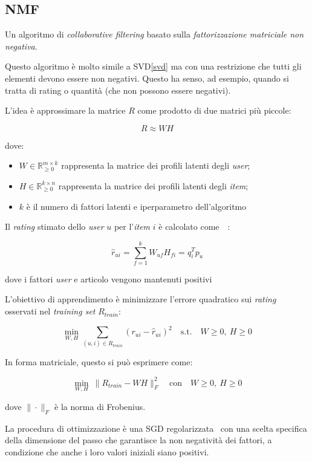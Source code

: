 \subsection{NMF}\label{nmf}

Un algoritmo di \textit{collaborative filtering} basato sulla \textit{fattorizzazione matriciale non negativa}.  

Questo algoritmo è molto simile a SVD\ref{svd} ma con una restrizione che tutti gli elementi devono essere non negativi. Questo ha senso, ad esempio, quando si tratta di rating o quantità (che non possono essere negativi).

L'idea è approssimare la matrice $R$ come prodotto di due matrici più piccole:

\[
R \approx WH
\]

dove:
\begin{itemize}
    \item $W \in \mathbb{R}_{\geq 0}^{m \times k}$ rappresenta la matrice dei profili latenti degli \textit{user};
    \item $H \in \mathbb{R}_{\geq 0}^{k \times n}$ rappresenta la matrice dei profili latenti degli \textit{item};
    \item $k$ è il numero di fattori latenti e iperparametro dell'algoritmo
\end{itemize}

Il \textit{rating} stimato dello \textit{user} $u$ per l'\textit{item} $i$ è calcolato come~\cite{NMF2}~\cite{NMF3}:

\[
\hat{r}_{ui} = \sum_{f=1}^k W_{uf} H_{fi} = q_i^T p_u
\]

dove i fattori \textit{user} e articolo vengono mantenuti positivi

L'obiettivo di apprendimento è minimizzare l'errore quadratico sui \textit{rating} osservati nel \textit{training set} $R_{train}$:

\[
\min_{W, H} \sum_{(u,i) \in R_{train}} \left( r_{ui} - \hat{r}_{ui} \right)^2 \quad \text{s.t.} \quad W \geq 0,\ H \geq 0
\]

In forma matriciale, questo si può esprimere come:

\[
\min_{W, H} \ \| R_{train} - WH \|_F^2 \quad \text{con} \quad W \geq 0,\ H \geq 0
\]

dove $\| \cdot \|_F$ è la norma di Frobenius.

La procedura di ottimizzazione è una SGD regolarizzata~\cite{NMF} con una scelta specifica della dimensione del passo che garantisce la non negatività dei fattori, a condizione che anche i loro valori iniziali siano positivi.

